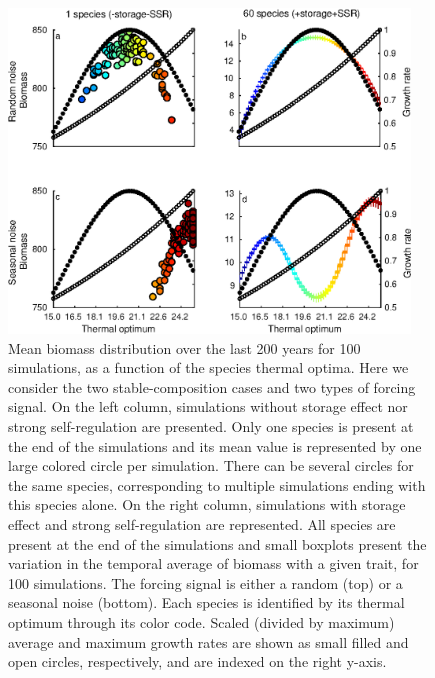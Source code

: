 \documentclass[a4paper,12pt]{article}
\begin{document}
\begin{figure}[!ht]
\begin{centering}
\includegraphics[bb=0bp 0bp 356bp 296bp,width=0.95\textwidth]{Fig3}
\par\end{centering}
\caption{Mean biomass distribution over the last 200 years for 100 simulations,
as a function of the species thermal optima. Here we consider the
two stable-composition cases and two types of forcing signal. On the
left column, simulations without storage effect nor strong self-regulation
are presented. Only one species is present at the end of the simulations
and its mean value is represented by one large colored circle per
simulation. There can be several circles for the same species, corresponding
to multiple simulations ending with this species alone. On the right
column, simulations with storage effect and strong self-regulation
are represented. All species are present at the end of the simulations
and small boxplots present the variation in the temporal average of
biomass with a given trait, for 100 simulations. The forcing signal
is either a random (top) or a seasonal noise (bottom). Each species
is identified by its thermal optimum through its color code. Scaled
(divided by maximum) average and maximum growth rates are shown as
small filled and open circles, respectively, and are indexed on the
right y-axis. \label{fig:Mean-biomass-in_stable_cases}}
\end{figure}
\end{document}
